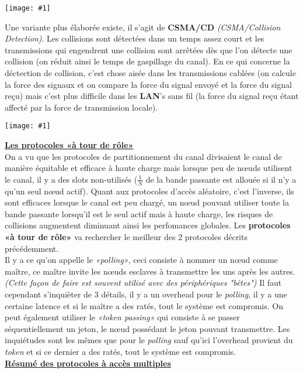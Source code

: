 \documentclass{article}
\newcommand{\imgR}[2]{\begin{center}\texttt{[image: \#1]}\end{center}}
\newcommand{\imgRT}[2]{\begin{center}\texttt{[image: \#1]}\end{center}}
\newcommand{\stitre}[1]{\noindent\textbf{\underline{#1}} \\}
\newcommand{\neuSP}{n\oe ud }
\newcommand{\neuSPs}{n\oe uds }
\begin{document}
\imgRT{CN_112.png}{200}

Une variante plus élaborée existe, il s'agit de \textbf{CSMA/CD} \textit{(CSMA/Collision 
Detection)}. Les collisions sont détectées dans un temps assez court et les transmissions qui engendrent une 
collision sont arrêtées dès que l'on détecte une collision (on réduit ainsi le temps de gaspillage du canal). En
ce qui concerne la déctection de collision, c'est chose aisée dans les transmissions cablées (on calcule la force 
des signaux et on compare la force du signal envoyé et la force du signal reçu) mais c'est plus difficile dans 
les \textbf{LAN}'s sans fil (la force du signal reçu étant affecté par la force de transmission locale).

\imgR{CN_113.png}{200}
\newpage
\stitre{Les protocoles «à tour de rôle»}

\noindent On a vu que les protocoles de partitionnement du canal divisaient le canal de manière équitable et 
efficace à haute charge mais lorsque peu de \neuSPs utilisent le canal, il y a des slots non-utilisés ($\frac{1}
{N}$ de la bande passante est allouée si il n'y a qu'un seul \neuSP actif). Quant aux protocoles d'accès 
aléatoire, c'est l'inverse, ils sont efficaces lorsque le canal est peu chargé, un \neuSP pouvant utiliser toute la
bande passante lorsqu'il est le seul actif mais à haute charge, les risques de collisions augmentent diminuant 
ainsi les perfomances globales. Les \textbf{protocoles «à tour de rôle»} va rechercher le meilleur des 2 
protocoles décrits précédemment.\\
Il y a ce qu'on appelle le \textit{«polling»}, ceci consiste à nommer un \neuSP comme maître, ce maître invite les 
\neuSPs esclaves à transmettre les uns après les autres. \textit{(Cette façon de faire est souvent utilisé avec 
des périphériques "bêtes")} Il faut cependant s'inquièter de 3 détails, il y a un overhead pour le
\textit{polling}, il y a une certaine latence et si le maître a des ratés, tout le système est compromis. On peut 
également utiliser le \textit{«token passing»} qui consiste à se passer séquentiellement un jeton, le \neuSP 
possédant le jeton pouvant transmettre. Les inquiétudes sont les mêmes que pour le \textit{polling} sauf qu'ici 
l'overhead provient du \textit{token} et si ce dernier a des ratés, tout le système est compromis. \\

\stitre{Résumé des protocoles à accès multiples}
\end{document}
